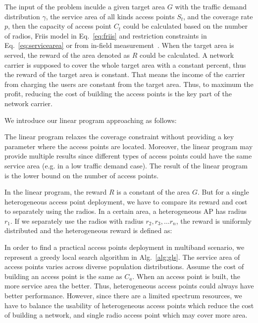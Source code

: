 The input of the problem inculde a given target area $G$ with the traffic demand distribution $\gamma$, 
the service area of all kinds access points $S_t$, and the coverage rate $p$, then the capacity of access 
point $C_t$ could be calculated based on the number of radios, Friis model in Eq.~\ref{eq:friis} 
and restriction constraints in Eq.~\ref{eq:servicearea} or from in-field measurement~\cite{cuileveraging}. 
When the target area is served, the reward of the area denoted as $R$ could be calculated. 
A network carrier is supposed to cover the whole target area with a constant percent, thus the reward 
of the target area is constant. That means the income of the carrier from charging the users are constant
from the target area. 
Thus, to maximum the profit, reducing the cost of building the access points is the key part of the network
carrier. 

We introduce our linear program approaching as follows:



The linear program relaxes the coverage constraint without providing a key parameter where the access 
points are located. Moreover, the linear program may provide multiple results since different types of 
access points could have the same service area (e.g. in a low traffic demand case). The result of the 
linear program is the lower bound on the number of access points. 

In the linear program, the reward $R$ is a constant of the area $G$. But for a single heterogeneous access
point deployment, we have to compare its reward and cost to separately using the radios.
In a certain area, a heterogeneous AP has radius $r_1$. If we separately use the radios with
radius $r_2,r_3,\dots r_n$, the reward is uniformly distributed and the heterogeneous reward is defined as:

In order to find a practical access points deployment in multiband scenario, we represent 
a greedy local search algorithm in Alg.~\ref{alg:gls}. The service area of access points varies 
across diverse population distributions. Assume the cost of building an access point is the same as $C_a$. 
When an access point is built, the more service area the better. Thus, heterogeneous access points
could always have better performance. However, since there are a limited spectrum resources,
we have to balance the usability of heterogeneous access points which reduce the cost of building 
a network, and single radio access point which may cover more area.


